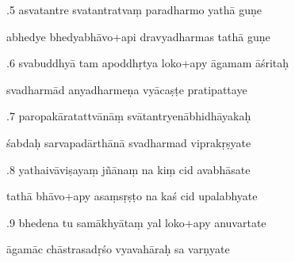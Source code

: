 \documentclass[article,12pt,a4paper]{memoir}%
\newcounter{parCount}
\begin{document}
	  
	  \pstart {}.5 asvatantre svatantratvaṃ paradharmo yathā guṇe 
	{}
	\pend%
      

	  
	  \pstart \leavevmode%
	abhedye bhedyabhāvo+api dravyadharmas tathā guṇe 
	{}
	\pend%
      

	  
	  \pstart {}.6 svabuddhyā tam apoddhṛtya loko+apy āgamam āśritaḥ 
	{}
	\pend%
      

	  
	  \pstart \leavevmode%
	svadharmād anyadharmeṇa vyācaṣṭe pratipattaye 
	{}
	\pend%
      

	  
	  \pstart {}.7 paropakāratattvānāṃ svātantryenābhidhāyakaḥ 
	{}
	\pend%
      

	  
	  \pstart \leavevmode%
	śabdaḥ sarvapadārthānā svadharmad viprakṛṣyate 
	{}
	\pend%
      

	  
	  \pstart {}.8 yathaivāviṣayaṃ jñānaṃ na kiṃ cid avabhāsate 
	{}
	\pend%
      

	  
	  \pstart \leavevmode%
	tathā bhāvo+apy asaṃsṛṣṭo na kaś cid upalabhyate 
	{}
	\pend%
      

	  
	  \pstart {}.9 bhedena tu samākhyātaṃ yal loko+apy anuvartate 
	{}
	\pend%
      

	  
	  \pstart \leavevmode%
	āgamāc chāstrasadṛśo vyavahāraḥ sa varṇyate 
	{}
	\pend%
      
\end{document}
